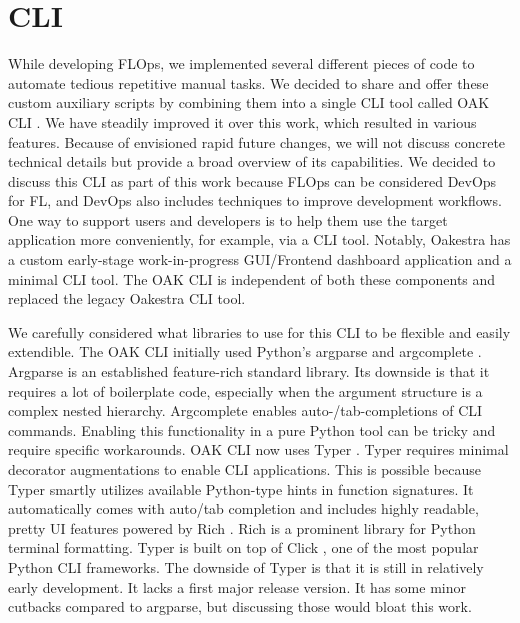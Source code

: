 \section{CLI}

While developing FLOps, we implemented several different pieces of code to automate tedious repetitive manual tasks.
We decided to share and offer these custom auxiliary scripts by combining them into a single CLI tool called OAK CLI \cite{cli_code}.
We have steadily improved it over this work, which resulted in various features.
Because of envisioned rapid future changes, we will not discuss concrete technical details but provide a broad overview of its capabilities.
We decided to discuss this CLI as part of this work because FLOps can be considered DevOps for FL, and DevOps also includes techniques to improve development workflows.
One way to support users and developers is to help them use the target application more conveniently, for example, via a CLI tool.
Notably, Oakestra has a custom early-stage work-in-progress GUI/Frontend dashboard application \cite{oakestra_dashboard} and a minimal CLI tool.
The OAK CLI is independent of both these components and replaced the legacy Oakestra CLI tool.

We carefully considered what libraries to use for this CLI to be flexible and easily extendible.
The OAK CLI initially used Python's argparse \cite{python_argparse} and argcomplete \cite{python_argcomplete}.
Argparse is an established feature-rich standard library.
Its downside is that it requires a lot of boilerplate code, especially when the argument structure is a complex nested hierarchy.
Argcomplete enables auto-/tab-completions of CLI commands.
Enabling this functionality in a pure Python tool can be tricky and require specific workarounds.
OAK CLI now uses Typer \cite{typer}.
Typer requires minimal decorator augmentations to enable CLI applications.
This is possible because Typer smartly utilizes available Python-type hints in function signatures.
It automatically comes with auto/tab completion and includes highly readable, pretty UI features powered by Rich \cite{rich}.
Rich is a prominent library for Python terminal formatting.
Typer is built on top of Click \cite{click}, one of the most popular Python CLI frameworks.
The downside of Typer is that it is still in relatively early development.
It lacks a first major release version.
It has some minor cutbacks compared to argparse, but discussing those would bloat this work.

